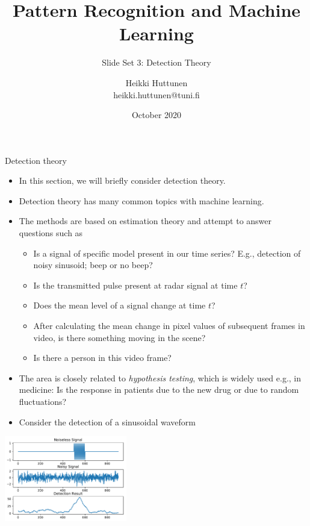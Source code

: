 \documentclass[10pt, aspectratio=169]{beamer} %
\title{Pattern Recognition and Machine Learning}
\subtitle{Slide Set 3: Detection Theory}
\author{Heikki Huttunen\\
heikki.huttunen@tuni.fi}
\institute{Signal Processing\\Tampere University}
\date{October 2020}
\begin{document}
\maketitle


\lstset{language=Python,style=mystyle} 

\begin{frame}[allowframebreaks=0.8]
 {Detection theory}
\begin{itemize}
\item In this section, we will briefly consider
detection theory.
\item Detection theory has many common topics with machine learning.
\item The methods are based on estimation theory and attempt
to answer questions such as
\begin{itemize}
\item Is a signal of specific model present in our time series?
E.g., detection of noisy sinusoid; beep or no beep?
\item Is the transmitted pulse present at radar signal at time $t$?
\item Does the mean level of a signal change at time $t$?
\item After calculating the mean change in pixel values of subsequent
frames in video, is there something moving in the scene?
\item Is there a person in this video frame?
\end{itemize}
\item The area is closely related to \emph{hypothesis testing}, which
is widely used e.g., in medicine: Is the response in patients due
to the new drug or due to random fluctuations?
\item Consider the detection of a sinusoidal waveform
\end{itemize}
\centerline{\includegraphics[width=0.4\textwidth]{rayleighSinusoid.pdf}}
\end{frame}
\end{document}
